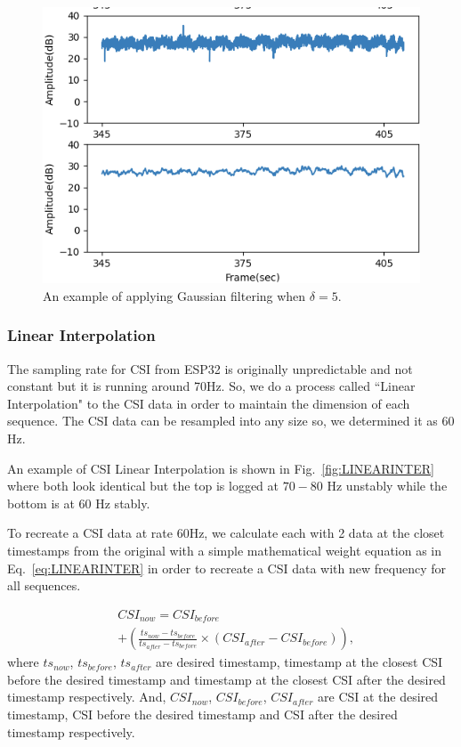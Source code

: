 \documentclass[10pt,letterpaper]{article}
\begin{document}
	
	\begin{figure}[htbp]
		\centerline{\includegraphics[width=120mm,scale=0.9]{FILPD_H2G.png}}
		\caption{An example of applying Gaussian filtering when $\delta=5$.}
		\label{fig:GAUSSIAN}
	\end{figure}


	\subsubsection*{Linear Interpolation}
	
	The sampling rate for CSI from ESP32 is originally unpredictable and not constant but it is running around 70Hz. So, we do a process called ``Linear Interpolation" to the CSI data in order to maintain the dimension of each sequence. The CSI data can be resampled into any size so, we determined it as 60 Hz.
	
	An example of CSI Linear Interpolation is shown in Fig.~\ref{fig:LINEARINTER} where both look identical but the top is logged at $70-80$ Hz unstably while the bottom is at $60$ Hz stably.
	
To recreate a CSI data at rate 60Hz, we calculate each with 2 data at the closet timestamps from the original with a simple mathematical weight equation as in Eq.~\ref{eq:LINEARINTER} in order to recreate a CSI data with new frequency for all sequences.
	
	\begin{equation}
		\begin{aligned}
			& CSI_{now} = CSI_{before} \\ 
			& + \left(  \frac{ts_{now}-ts_{before}}{ts_{after}-ts_{before}}  \times (CSI_{after}-CSI_{before})   \right),
			\label{eq:LINEARINTER}
		\end{aligned}
	\end{equation}
	where $ts_{now}$, $ts_{before}$, $ts_{after}$ are desired timestamp, timestamp at the closest CSI before the desired timestamp and timestamp at the closest CSI after the desired timestamp respectively. And, $CSI_{now}$, $CSI_{before}$, $CSI_{after}$ are CSI at the desired timestamp, CSI before the desired timestamp and CSI after the desired timestamp respectively.
	
\end{document}
